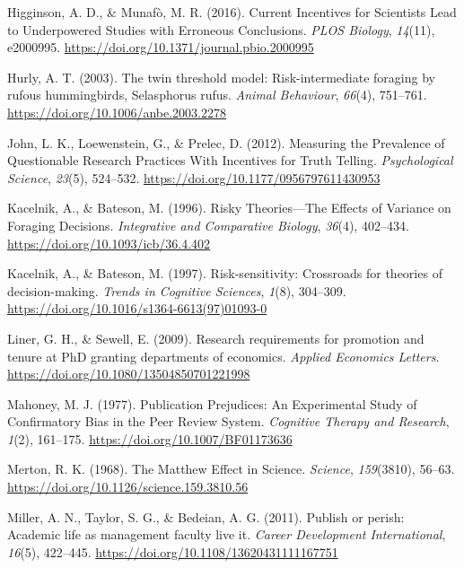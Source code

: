 \documentclass[
  british,
  a4paper,
  ,man,mask,floatsintext]{apa6}
\newlength{\cslhangindent}
\newenvironment{CSLReferences}[2] %
 {\begin{list}{}{%
  \setlength{\itemindent}{0pt}
  \setlength{\leftmargin}{0pt}
  \setlength{\parsep}{0pt}
  \ifodd #1
   \setlength{\leftmargin}{\cslhangindent}
   \setlength{\itemindent}{-1\cslhangindent}
  \fi
  \setlength{\itemsep}{#2\baselineskip}}}
 {\end{list}}
\begin{document}
\begin{CSLReferences}{1}{0}
Higginson, A. D., \& Munafò, M. R. (2016). Current {Incentives} for {Scientists Lead} to {Underpowered Studies} with {Erroneous Conclusions}. \emph{PLOS Biology}, \emph{14}(11), e2000995. \url{https://doi.org/10.1371/journal.pbio.2000995}

Hurly, A. T. (2003). The twin threshold model: Risk-intermediate foraging by rufous hummingbirds, {Selasphorus} rufus. \emph{Animal Behaviour}, \emph{66}(4), 751--761. \url{https://doi.org/10.1006/anbe.2003.2278}

John, L. K., Loewenstein, G., \& Prelec, D. (2012). Measuring the {Prevalence} of {Questionable Research Practices With Incentives} for {Truth Telling}. \emph{Psychological Science}, \emph{23}(5), 524--532. \url{https://doi.org/10.1177/0956797611430953}

Kacelnik, A., \& Bateson, M. (1996). Risky {Theories}---{The Effects} of {Variance} on {Foraging Decisions}. \emph{Integrative and Comparative Biology}, \emph{36}(4), 402--434. \url{https://doi.org/10.1093/icb/36.4.402}

Kacelnik, A., \& Bateson, M. (1997). Risk-sensitivity: Crossroads for theories of decision-making. \emph{Trends in Cognitive Sciences}, \emph{1}(8), 304--309. \url{https://doi.org/10.1016/s1364-6613(97)01093-0}

Liner, G. H., \& Sewell, E. (2009). Research requirements for promotion and tenure at {PhD} granting departments of economics. \emph{Applied Economics Letters}. \url{https://doi.org/10.1080/13504850701221998}

Mahoney, M. J. (1977). Publication {Prejudices}: {An Experimental Study} of {Confirmatory Bias} in the {Peer Review System}. \emph{Cognitive Therapy and Research}, \emph{1}(2), 161--175. \url{https://doi.org/10.1007/BF01173636}

Merton, R. K. (1968). The {Matthew Effect} in {Science}. \emph{Science}, \emph{159}(3810), 56--63. \url{https://doi.org/10.1126/science.159.3810.56}

Miller, A. N., Taylor, S. G., \& Bedeian, A. G. (2011). Publish or perish: Academic life as management faculty live it. \emph{Career Development International}, \emph{16}(5), 422--445. \url{https://doi.org/10.1108/13620431111167751}


\end{CSLReferences}
\end{document}
